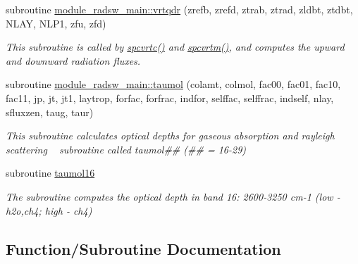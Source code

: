 \begin{DoxyCompactItemize}
\item 
subroutine \hyperlink{group__module__radsw__main_gad227ccde86a01f47c1ab3b4bed5ba1be}{module\+\_\+radsw\+\_\+main\+::vrtqdr} (zrefb, zrefd, ztrab, ztrad, zldbt, ztdbt, N\+L\+AY, N\+L\+P1, zfu, zfd)
\begin{DoxyCompactList}\small\item\em This subroutine is called by \hyperlink{group__module__radsw__main_gaeb992f35bdf7dbf9ea8709d7d91dedfd}{spcvrtc()} and \hyperlink{group__module__radsw__main_ga859cc14063a58e9d0a252e4366b9fff3}{spcvrtm()}, and computes the upward and downward radiation fluxes. \end{DoxyCompactList}\end{DoxyCompactItemize}
\begin{DoxyCompactItemize}
\item 
subroutine \hyperlink{group__module__radsw__main_gaa82121d21c1e8f2ca938378249fea135}{module\+\_\+radsw\+\_\+main\+::taumol} (colamt, colmol, fac00, fac01, fac10, fac11, jp, jt, jt1, laytrop, forfac, forfrac, indfor, selffac, selffrac, indself, nlay, sfluxzen, taug, taur)
\begin{DoxyCompactList}\small\item\em This subroutine calculates optical depths for gaseous absorption and rayleigh scattering ~\newline
 subroutine called taumol\#\# (\#\# = 16-\/29) \end{DoxyCompactList}\item 
\mbox{\label{group__module__radsw__main_ga8702f5f6285ff1a5cbfad740545fffb6}} 
subroutine \hyperlink{group__module__radsw__main_ga8702f5f6285ff1a5cbfad740545fffb6}{taumol16}
\begin{DoxyCompactList}\small\item\em The subroutine computes the optical depth in band 16\+: 2600-\/3250 cm-\/1 (low -\/ h2o,ch4; high -\/ ch4) \end{DoxyCompactList}\end{DoxyCompactItemize}


\subsection{Function/\+Subroutine Documentation}
\mbox{\label{group__module__radsw__main_ga89ca572fa54a63a21009caa0760d405b}} 
